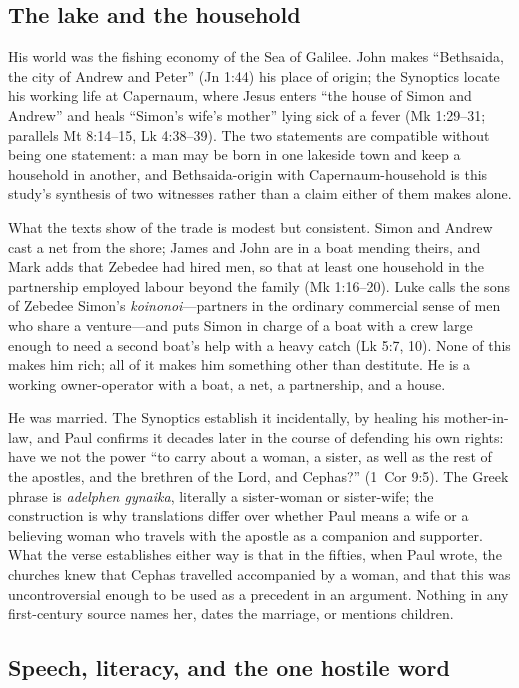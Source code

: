\subsection{The lake and the household}

His world was the fishing economy of the Sea of Galilee. John makes
``Bethsaida, the city of Andrew and Peter'' (Jn 1:44) his place of origin;
the Synoptics locate his working life at Capernaum, where Jesus enters ``the
house of Simon and Andrew'' and heals ``Simon's wife's mother'' lying sick
of a fever (Mk 1:29--31; parallels Mt 8:14--15, Lk 4:38--39). The two
statements are compatible without being one statement: a man may be born in
one lakeside town and keep a household in another, and Bethsaida-origin with
Capernaum-household is this study's synthesis of two witnesses rather than a
claim either of them makes alone.

What the texts show of the trade is modest but consistent. Simon and Andrew
cast a net from the shore; James and John are in a boat mending theirs, and
Mark adds that Zebedee had hired men, so that at least one household in the
partnership employed labour beyond the family (Mk 1:16--20). Luke calls the
sons of Zebedee Simon's \textit{koinonoi}---partners in the ordinary
commercial sense of men who share a venture---and puts Simon in charge of a
boat with a crew large enough to need a second boat's help with a heavy catch
(Lk 5:7, 10). None of this makes him rich; all of it makes him something
other than destitute. He is a working owner-operator with a boat, a net, a
partnership, and a house.

He was married. The Synoptics establish it incidentally, by healing his
mother-in-law, and Paul confirms it decades later in the course of defending
his own rights: have we not the power ``to carry about a woman, a sister, as
well as the rest of the apostles, and the brethren of the Lord, and Cephas?''
(1~Cor 9:5). The Greek phrase is \textit{adelphen gynaika}, literally a
sister-woman or sister-wife; the construction is why translations differ over
whether Paul means a wife or a believing woman who travels with the apostle
as a companion and supporter. What the verse establishes either way is that
in the fifties, when Paul wrote, the churches knew that Cephas travelled
accompanied by a woman, and that this was uncontroversial enough to be used
as a precedent in an argument. Nothing in any first-century source names her,
dates the marriage, or mentions children.

\subsection{Speech, literacy, and the one hostile word}

